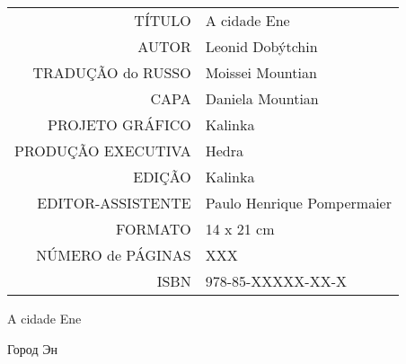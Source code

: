 \begin{vplace}[1]
\begin{table}[ht!]
\MyriadPro
\scriptsize
\begin{tabular}{rl}
TÍTULO            & A cidade Ene 									   \\[2pt]
AUTOR             & Leonid Dobýtchin                          		   \\[2pt]
TRADUÇÃO do RUSSO & Moissei Mountian 	 			                   \\[2pt]
CAPA              & Daniela Mountian                                   \\[2pt]
PROJETO GRÁFICO   & Kalinka                                            \\[2pt]
PRODUÇÃO EXECUTIVA & Hedra                                             \\[2pt]
EDIÇÃO            & Kalinka 		                                   \\[2pt] 
EDITOR-ASSISTENTE & Paulo Henrique Pompermaier                         \\[2pt] 
FORMATO           & 14 x 21 cm                                         \\[2pt]
NÚMERO de PÁGINAS & XXX                                                \\[2pt]
ISBN              & 978-85-XXXXX-XX-X                                 
\end{tabular}
\end{table}
\end{vplace}

\newpage
\MyriadPro
\begin{center}
\small
A cidade Ene

Город Эн
\end{center}

\scriptsize


%




